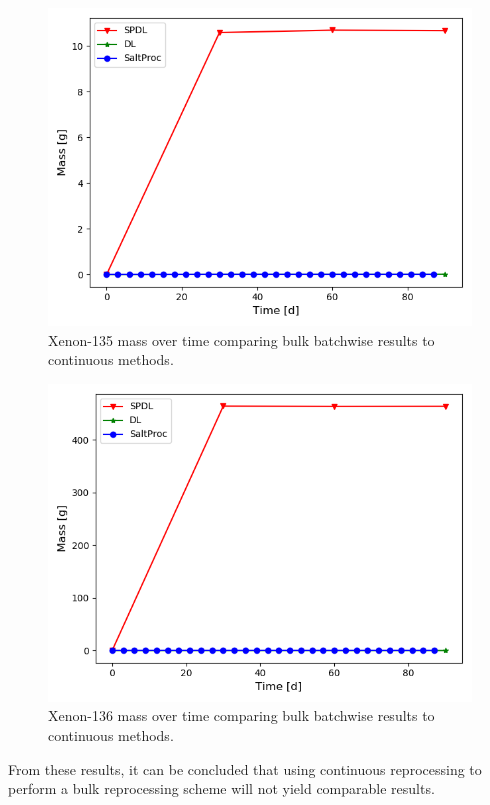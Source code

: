 \begin{figure}[H]
  \centering
  \includegraphics[scale=0.7]{images/soln-3-Xe135.png}
  \caption{Xenon-135 mass over time comparing bulk batchwise results to continuous methods.}
   \label{fig:bulk-comapre-xe135}
\end{figure}

\begin{figure}[H]
  \centering
  \includegraphics[scale=0.7]{images/soln-3-Xe136.png}
  \caption{Xenon-136 mass over time comparing bulk batchwise results to continuous methods.}
   \label{fig:bulk-comapre-xe136}
\end{figure}

From these results, it can be concluded that using continuous reprocessing to perform a bulk reprocessing scheme will not yield comparable results.%

